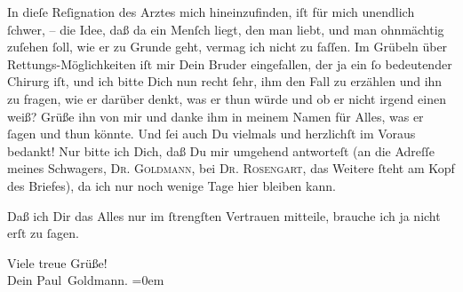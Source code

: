 \pstart
           In dieſe Reſignation des Arztes {\pb}mich hineinzufinden, iſt für mich
               unendlich{ }ſchwer, – die Idee, daß da ein Menſch liegt, den man liebt, und man  ohnmächtig zuſehen{ }ſoll, wie er zu Grunde geht, vermag ich nicht zu faſſen. Im
               Grübeln über Rettungs-Möglichkeiten iſt mir Dein Bruder eingefallen, der ja ein{ }ſo bedeutender Chirurg iſt,
               und ich bitte Dich nun recht{ }ſehr, ihm  den Fall zu erzählen und ihn zu fragen, wie er darüber denkt, was er thun
               würde und ob er nicht irgend einen \label{K_L03243-3v}\label{K_L03243-3} weiß? Grüße ihn von mir und danke ihm in meinem Namen für Alles, was er{ }ſagen
               und thun könnte. Und{ }ſei auch Du vielmals und {\pb}herzlichſt im Voraus bedankt! Nur bitte ich Dich, daß Du mir umgehend antworteſt
               (an die Adreſſe meines Schwagers, \textsc{Dr. Goldmann}, bei \textsc{Dr. }{ }\textsc{Rosengart}, das Weitere{ }ſteht am Kopf des Briefes), da ich nur noch wenige Tage hier bleiben kann.\pend
           
\pstart
           Daß ich Dir das Alles nur im{ }ſtrengſten Vertrauen mitteile, brauche ich ja nicht erſt
               zu{ }ſagen.\pend
           
\pstart
           Viele treue Grüße! {\\[\baselineskip]}Dein \spacefill\mbox{Paul Goldmann.}\pend
           \leftskip=0em{}\endnumbering{}  \newcommand{\dateiname}{L03243}\newcommand{\titel}{Paul Goldmann an Arthur Schnitzler, 16. 4. [1906]}\newcommand{\editorInnen}{Martin Anton Müller und Laura Untner}
